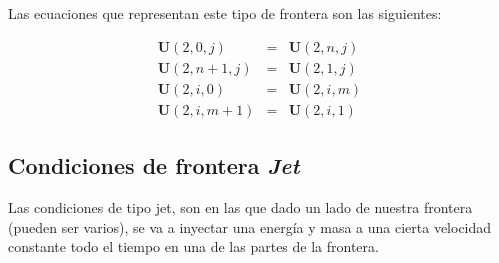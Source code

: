 \documentclass[12pt,a4paper]{book}
\begin{document}
Las ecuaciones que representan este tipo de frontera son las siguientes:

\begin{eqnarray}
\textbf{U}(2,0,j)&=&\textbf{U}(2,n,j) \\
\textbf{U}(2,n+1,j)&=&\textbf{U}(2,1,j) \\
\textbf{U}(2,i,0)&=&\textbf{U}(2,i,m) \\
\textbf{U}(2,i,m+1)&=&\textbf{U}(2,i,1) 
\end{eqnarray}

\subsection{Condiciones de frontera \emph{Jet} }
Las condiciones de tipo jet, son en las que dado un lado de nuestra frontera (pueden ser varios), se va a inyectar una energía y masa a una cierta velocidad constante todo el tiempo en una de las partes de la frontera.
\end{document}
